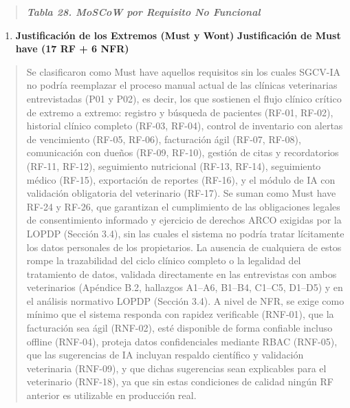 \documentclass[
]{article}
\begin{document}
\begin{quote}
\protect{}\label{_bookmark106}{}\emph{\textbf{Tabla 28.
MoSCoW por Requisito No Funcional}}
\end{quote}

\begin{enumerate}
\def\labelenumi{\arabic{enumi}.}
\setcounter{enumi}{4}
\item
  \protect{}\label{_bookmark107}{}\textbf{Justificación de
  los Extremos (Must y Won\textquotesingle t)}
  \protect{}\label{_bookmark108}{}\textbf{Justificación de
  Must have (17 RF + 6 NFR)}
\end{enumerate}

\begin{quote}
Se clasificaron como Must have aquellos requisitos sin los cuales
SGCV-IA no podría reemplazar el proceso manual actual de las clínicas
veterinarias entrevistadas (P01 y P02), es decir, los que
sostienen el flujo clínico crítico de extremo a extremo: registro y
búsqueda de pacientes (RF-01, RF-02), historial clínico completo (RF-03,
RF-04), control de inventario con alertas de vencimiento (RF-05, RF-06),
facturación ágil (RF-07, RF-08), comunicación con dueños (RF-09, RF-10),
gestión de citas y recordatorios (RF-11, RF-12), seguimiento nutricional
(RF-13, RF-14), seguimiento médico (RF-15), exportación de reportes
(RF-16), y el módulo de IA con validación obligatoria del veterinario
(RF-17). Se suman como Must have RF-24 y RF-26, que garantizan el
cumplimiento de las obligaciones legales de consentimiento informado y
ejercicio de derechos ARCO exigidas por la LOPDP (Sección 3.4), sin las
cuales el sistema no podría tratar lícitamente los datos personales de
los propietarios. La ausencia de cualquiera de estos rompe la
trazabilidad del ciclo clínico completo o la legalidad del tratamiento
de datos, validada directamente en las entrevistas con ambos
veterinarios (Apéndice B.2, hallazgos A1--A6, B1--B4, C1--C5, D1--D5) y
en el análisis normativo LOPDP (Sección 3.4). A nivel de NFR, se exige
como mínimo que el sistema responda con rapidez verificable (RNF-01),
que la facturación sea ágil (RNF-02), esté disponible de forma confiable
incluso offline (RNF-04), proteja datos confidenciales mediante RBAC
(RNF-05), que las sugerencias de IA incluyan respaldo científico y
validación veterinaria (RNF-09), y que dichas sugerencias sean
explicables para el veterinario (RNF-18), ya que sin estas condiciones
de calidad ningún RF anterior es utilizable en producción real.
\end{quote}
\end{document}
